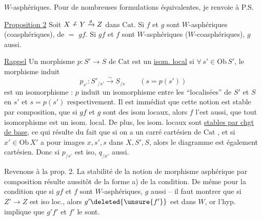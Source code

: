 
$W$-asphériques. Pour de nombreuses   formulations équivalentes, je renvoie à P.S.

\uline{Proposition 2} Soit $X\mathrel{\overset{f}{\relbar}}Y\xrightarrow{g}Z$ dans $\mathrm{Cat}$. Si $f$ et $g$ sont  $W$-asphériques (coasphériques), de $=$ $gf$. Si $gf$ et $f$ sont $W$-asphériques ($W$-coasphériques), $g$ aussi.

 \uline{Rappel} Un morphisme $p:S'\longrightarrow S$ de $\mathrm{Cat}$ est un \uline{isom. local} si $\forall\,s'\in\mathrm{Ob}\,S'$, le morphisme induit \[p_{s'}:S'_{/s'}\xrightarrow{\sim}S_{/s}\qquad(s=p(s'))\] est un isomorphisme : $p$ induit un isomorphisme entre les ``localisées'' de $S'$ et $S$ en $s'$ et $s=p(s')$ respectivement. Il est immédiat que cette notion est stable par composition, que si $gf$ et $g$ sont des isom locaux, alors $f$ l'est aussi, que tout isomorphisme est un isom. local. De plus, les isom. locaux sont \uline{stables par chgt de base}, ce qui résulte du fait  que si on a un carré cartésien de $\mathrm{Cat}$ , et si $x'\in\mathrm{Ob}\,X'$ a pour images $x,s',s$ dans $X,S',S$, alors le diagramme  est également cartésien. Donc si $p_{/s'}$ est iso, $q_{/x'}$ aussi.


Revenons à la prop. 2. La stabilité de la notion de morphisme asphérique par composition  résulte aussitôt de la forme a) de la condition. De même pour la condition que si $gf$ et $f$ sont $W$-asphériques, $g$ aussi -- il faut montrer que si $Z'\longrightarrow Z$ est iso loc., alors $g'\deleted{\unsure{f'}}$ est dans $W$, or l'hyp. implique que $g'f'$ et $f'$ le sont.

